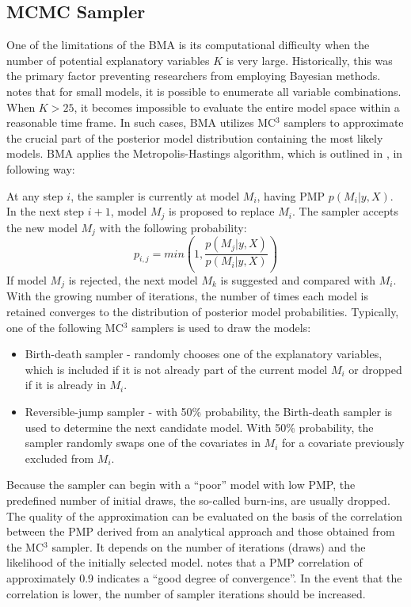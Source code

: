 \begin{refsection}
\subsection{\ac{MCMC} Sampler}
\label{ch2sec:mc3}
One of the limitations of the \ac{BMA} is its computational difficulty when the number of potential explanatory variables $K$ is very large. Historically, this was the primary factor preventing researchers from employing Bayesian methods. \textcite{Zeugner2011} notes that for small models, it is possible to enumerate all variable combinations. When $K > 25$, it becomes impossible to evaluate the entire model space within a reasonable time frame. In such cases, \ac{BMA} utilizes MC$^{3}$ samplers to approximate the crucial part of the posterior model distribution containing the most likely models. \ac{BMA} applies the Metropolis-Hastings algorithm, which is outlined in \textcite{Zeugner2011}, in following way:

At any step $i$, the sampler is currently at model $M_{i}$, having \ac{PMP} $p(M_{i} \vert y,X)$. In the next step $i+1$, model $M_{j}$ is proposed to replace $M_{i}$. The sampler accepts the new model $M_{j}$ with the following probability:
\begin{equation}\label{ch2eq:sampler}
	p_{i,j} = min \left( 1, \frac{p(M_{j} \vert y,X)}{p(M_{i} \vert y,X)}\right)
\end{equation}
If model $M_{j}$ is rejected, the next model $M_{k}$ is suggested and compared with $M_{i}$. With the growing number of iterations, the number of times each model is retained converges to the distribution of posterior model probabilities. Typically, one of the following MC$^{3}$ samplers is used to draw the models:
%
\begin{itemize}
	\item{Birth-death sampler - randomly chooses one of the explanatory variables, which is included if it is not already part of the current model $M_{i}$ or dropped if it is already in $M_{i}$.}
	\item{Reversible-jump sampler - with 50\% probability, the Birth-death sampler is used to determine the next candidate model. With 50\% probability, the sampler randomly swaps one of the covariates in $M_{i}$ for a covariate previously excluded from $M_{i}$.}
\end{itemize}
%
Because the sampler can begin with a ``poor'' model with low \ac{PMP}, the predefined number of initial draws, the so-called burn-ins, are usually dropped. The quality of the approximation can be evaluated on the basis of the correlation between the \ac{PMP} derived from an analytical approach and those obtained from the MC$^{3}$ sampler. It depends on the number of iterations (draws) and the likelihood of the initially selected model. \textcite{Zeugner2011} notes that a \ac{PMP} correlation of approximately 0.9 indicates a ``good degree of convergence''. In the event that the correlation is lower, the number of sampler iterations should be increased. 


\end{refsection}
